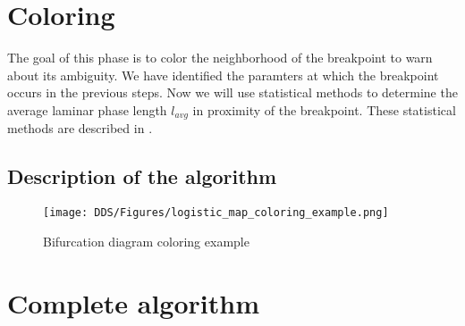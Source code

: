 

\section{Coloring}
The goal of this phase is to color the neighborhood of the breakpoint to warn about its ambiguity.
We have identified the paramters at which the breakpoint occurs in the previous steps.
Now we will use statistical methods to determine the average laminar phase length $l_{avg}$ in proximity of the breakpoint.
These statistical methods are described in \cite{Elaskar2022}.

\subsection{Description of the algorithm}

\begin{figure}[!h]
    \centering
    \texttt{[image: DDS/Figures/logistic\_map\_coloring\_example.png]}
    \caption{Bifurcation diagram coloring example}
    \label{fig:coloring_example}
\end{figure}

\section{Complete algorithm}

\endinput
